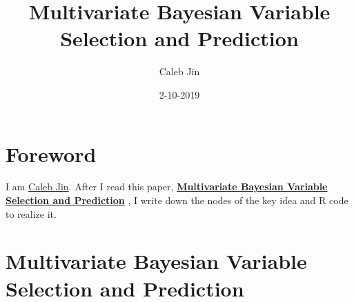 \documentclass[]{book}
\title{Multivariate Bayesian Variable Selection and Prediction}
\author{Caleb Jin}
\date{2-10-2019}
\begin{document}
\maketitle

{
\setcounter{tocdepth}{1}
\tableofcontents
}
\hypertarget{foreword}{%
\chapter{Foreword}\label{foreword}}

I am \href{https://www.sjin.name/}{Caleb Jin}. After I read this paper, \textbf{\href{https://rss.onlinelibrary.wiley.com/doi/abs/10.1111/1467-9868.00144}{Multivariate Bayesian Variable Selection and Prediction}} \citep{Brown}, I write down the nodes of the key idea and R code to realize it.

\newcommand\T{{\top}}
\newcommand\ubeta{{\boldsymbol \beta}}
\newcommand\uSigma{{\boldsymbol \Sigma}}
\newcommand\uepsilon{{\boldsymbol \epsilon}}
\newcommand\umu{{\boldsymbol \mu}}
\newcommand\utheta{{\boldsymbol \theta}}
\newcommand\ubg{{\boldsymbol \gamma}}
\newcommand\uphi{{\boldsymbol \phi}}
\newcommand\uxi{{\boldsymbol \xi}}

\newcommand\0{{\bf 0}}
\newcommand\uA{{\bf A}}
\newcommand\ua{{\bf a}}
\newcommand\uB{{\bf B}}
\newcommand\ub{{\bf b}}
\newcommand\uC{{\bf C}}
\newcommand\uD{{\bf D}}
\newcommand\uE{{\bf E}}
\newcommand\ue{{\bf e}}
\newcommand\uH{{\bf H}}
\newcommand\uI{{\bf I}}
\newcommand\uK{{\bf K}}
\newcommand\uM{{\bf M}}
\newcommand\uQ{{\bf Q}}
\newcommand\uV{{\bf V}}
\newcommand\uX{{\bf X}}
\newcommand\ux{{\bf x}}
\newcommand\uY{{\bf Y}}
\newcommand\uy{{\bf y}}
\newcommand\uz{{\bf z}}
\newcommand\diag{{\rm diag}}
\newcommand{\tr}{{\text tr}}

\hypertarget{multivariate-bayesian-variable-selection-and-prediction}{%
\chapter{Multivariate Bayesian Variable Selection and Prediction}\label{multivariate-bayesian-variable-selection-and-prediction}}
\end{document}
